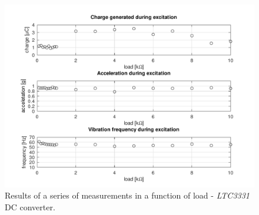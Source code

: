 \documentclass[12pt,a4paper]{article}
\begin{document}
\begin{figure}[ht!]
\includegraphics[scale=0.75]{results3331.pdf}
\caption{Results of a series of measurements in a function of load - \textit{LTC3331} DC converter.}
\label{fig:results3331}
\end{figure}

\FloatBarrier
\clearpage

\printbibliography

% 
%

\clearpage
\end{document}
